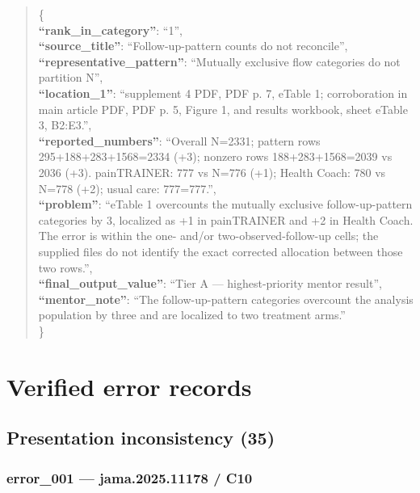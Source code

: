 \documentclass[
  letterpaper,
  9pt]{extreport}
\begin{document}
\begin{quote}
\{\\
\textbf{``rank\_in\_category''}: ``1'',\\
\textbf{``source\_title''}: ``Follow-up-pattern counts do not
reconcile'',\\
\textbf{``representative\_pattern''}: ``Mutually exclusive flow
categories do not partition N'',\\
\textbf{``location\_1''}: ``supplement 4 PDF, PDF p. 7, eTable 1;
corroboration in main article PDF, PDF p. 5, Figure 1, and results
workbook, sheet eTable 3, B2:E3.'',\\
\textbf{``reported\_numbers''}: ``Overall N=2331; pattern rows
295+188+283+1568=2334 (+3); nonzero rows 188+283+1568=2039 vs 2036 (+3).
painTRAINER: 777 vs N=776 (+1); Health Coach: 780 vs N=778 (+2); usual
care: 777=777.'',\\
\textbf{``problem''}: ``eTable 1 overcounts the mutually exclusive
follow-up-pattern categories by 3, localized as +1 in painTRAINER and +2
in Health Coach. The error is within the one- and/or
two-observed-follow-up cells; the supplied files do not identify the
exact corrected allocation between those two rows.'',\\
\textbf{``final\_output\_value''}: ``Tier A --- highest-priority mentor
result'',\\
\textbf{``mentor\_note''}: ``The follow-up-pattern categories overcount
the analysis population by three and are localized to two treatment
arms.''\\
\}
\end{quote}

\hypertarget{verified-error-records}{%
\chapter{Verified error records}\label{verified-error-records}}

\hypertarget{presentation-inconsistency-35}{%
\section{Presentation inconsistency
(35)}\label{presentation-inconsistency-35}}

\hypertarget{error_001--jama202511178--c10}{%
\subsection{error\_001 --- jama.2025.11178 /
C10}\label{error_001--jama202511178--c10}}
\end{document}
